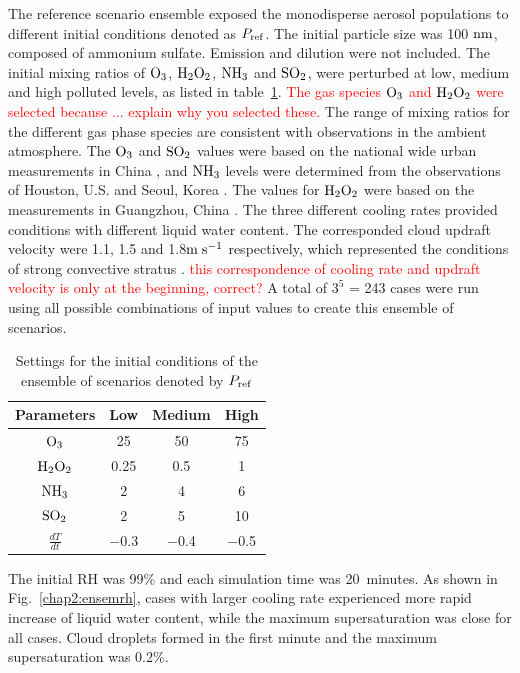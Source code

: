 \documentclass[edeposit,fullpage]{uiucthesis2009}
\makeatletter
\DeclareRobustCommand*\unit[1]
 {\ensuremath{%
   {\thinmuskip3mu\relax
    \def\mu{\text{\textmu}}\def~{\,}%
    \ifx\f@series\testbx\mathbf{#1}\else\mathrm{#1}\fi}}}
\makeatother
\begin{document}
The reference scenario ensemble exposed the monodisperse aerosol
populations to different initial conditions denoted as $P_{\rm
  ref}$. The initial particle size was 100 \unit{nm}, composed of
ammonium sulfate. Emission and dilution were not included. The initial
mixing ratios of $\rm O_3$, $\rm H_2O_2$, $\rm NH_3$ and $\rm SO_2$,
were perturbed at low, medium and high polluted levels, as listed in
table~\ref{TMI-setting}. \textcolor{red}{The gas species $\rm O_3$ and
  $\rm H_2O_2$ were selected because ... explain why you selected
  these.}  The range of mixing ratios for the different gas phase
species are consistent with observations in the ambient
atmosphere. The $\rm O_3$ and $\rm SO_2$ values were based on the
national wide urban measurements in China \citep{wang2014spatial}, and
$\rm NH_3$ levels were determined from the observations of Houston,
U.S. \citep{nowak2010airborne} and Seoul, Korea
\citep{phan2013analysis}. The values for $\rm H_2O_2$ were based on
the measurements in Guangzhou, China \citep{hua2008atmospheric}. The
three different cooling rates provided conditions with different
liquid water content. The corresponded cloud updraft velocity were
1.1, 1.5 and 1.8\unit{m\;s^{-1}} respectively, which represented the
conditions of strong convective stratus
\citep{peng2005importance}. \textcolor{red}{this correspondence of
  cooling rate and updraft velocity is only at the beginning,
  correct?} A total of $3^5$ = 243 cases were run using all possible
combinations of input values to create this ensemble of scenarios.

\begin{table}[ht]
\centering
\caption{Settings for the initial conditions of the ensemble of
  scenarios denoted by $P_{\rm ref}$}
\label{TMI-setting}
\begin{tabular}{c  c c  c}
\hline
Parameters & Low  & Medium & High\\
\hline
$\rm O_3$& 25 & 50 & 75 \\
$\rm H_2O_2$& 0.25 & 0.5 &  1\\
$\rm NH_3$ &2 & 4 & 6 \\
$\rm SO_2$&2&5& 10\\
$\frac{dT}{dt}$ &$-$0.3 &$ -$0.4&$-$0.5\\
\hline
\end{tabular}
\end{table}

The initial RH was 99\% and each simulation time was 20~minutes. As
shown in Fig.~\ref{chap2:ensemrh}, cases with larger cooling rate
experienced more rapid increase of liquid water content, while the
maximum supersaturation was close for all cases. Cloud droplets formed
in the first minute and the maximum supersaturation was 0.2\%.
\end{document}
